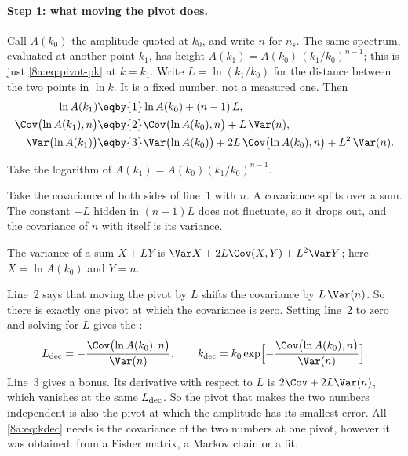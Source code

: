 \paragraph{Step 1: what moving the pivot does.}
Call $A(k_0)$ the amplitude quoted at $k_0$, and write $n$ for $n_s$. The same spectrum,
evaluated at another point $k_1$, has height $A(k_1)=A(k_0)\,(k_1/k_0)^{n-1}$; this is just
\eqref{8a:eq:pivot-pk} at $k=k_1$. Write $L=\ln(k_1/k_0)$ for the distance between the two
points in $\ln k$. It is a fixed number, not a measured one. Then
\begin{align}
  \ln A(k_1)&\eqby{1}\ln A(k_0)+(n-1)\,L ,
  \label{8a:eq:pivot-shift}\\
  \Cov\bigl(\ln A(k_1),n\bigr)
  &\eqby{2}\Cov\bigl(\ln A(k_0),n\bigr)+L\,\Var(n),
  \nonumber\\
  \Var\bigl(\ln A(k_1)\bigr)
  &\eqby{3}\Var\bigl(\ln A(k_0)\bigr)+2L\,\Cov\bigl(\ln A(k_0),n\bigr)+L^2\,\Var(n).
  \nonumber
\end{align}
\begin{explain}
  \item Take the logarithm of $A(k_1)=A(k_0)(k_1/k_0)^{n-1}$.
  \item Take the covariance of both sides of line~1 with $n$. A covariance splits over a sum. The
        constant $-L$ hidden in $(n-1)L$ does not fluctuate, so it drops out, and the covariance of
        $n$ with itself is its variance.
  \item The variance of a sum $X+LY$ is $\Var X+2L\Cov(X,Y)+L^2\Var Y$; here $X=\ln A(k_0)$ and $Y=n$.
\end{explain}
Line~2 says that moving the pivot by $L$ shifts the covariance by $L\,\Var(n)$. So there is
exactly one pivot at which the covariance is zero. Setting line~2 to zero and solving for $L$
gives the :
\begin{equation}
  L_{\rm dec}=-\frac{\Cov\bigl(\ln A(k_0),n\bigr)}{\Var(n)},
  \qquad
  k_{\rm dec}=k_0\exp\Bigl[-\frac{\Cov\bigl(\ln A(k_0),n\bigr)}{\Var(n)}\Bigr].
  \label{8a:eq:kdec}
\end{equation}
Line~3 gives a bonus. Its derivative with respect to $L$ is $2\Cov+2L\Var(n)$, which vanishes at
the same $L_{\rm dec}$. So the pivot that makes the two numbers independent is also the pivot at
which the amplitude has its smallest error. All \eqref{8a:eq:kdec} needs is the covariance of the
two numbers at one pivot, however it was obtained: from a Fisher matrix, a Markov chain or a fit.

